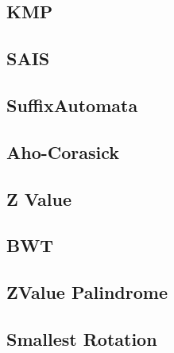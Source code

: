 \documentclass[a4paper,10pt,twocolumn,oneside]{article}
\begin{document}
%

\subsection{KMP}


\subsection{SAIS}


\subsection{SuffixAutomata}


\subsection{Aho-Corasick}


\subsection{Z Value}


\subsection{BWT}


\subsection{ZValue Palindrome}


\subsection{Smallest Rotation}


%
\end{document}
